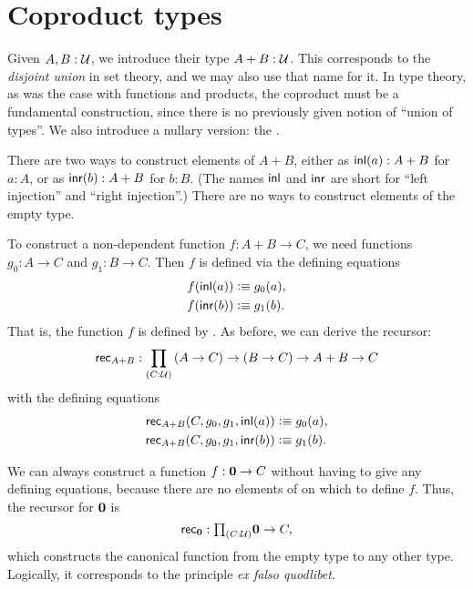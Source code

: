 \section{Coproduct types}
\label{sec:coproduct-types}

Given $A,B:\mathcal{U}$, we introduce their  type $A+B:\mathcal{U}$.
%
%
%
%
%
%
This corresponds to the \emph{disjoint union} in set theory, and we may also use that name for it.
In type theory, as was the case with functions and products, the coproduct must be a fundamental construction, since there is no previously given notion of ``union of types''.
We also introduce a
nullary version: the .
%
%
%

There are two ways to construct elements of $A+B$, either as ${\mathsf{inl}}(a) : A+B$ for $a:A$, or as
${\mathsf{inr}}(b):A+B$ for $b:B$.
(The names ${\mathsf{inl}}$ and ${\mathsf{inr}}$ are short for ``left injection'' and ``right injection''.)
There are no ways to construct elements of the empty type. 

To construct a non-dependent function $f : A+B \to C$, we need 
functions $g_0 : A \to C$ and $g_1 : B \to C$. Then $f$ is defined
via the defining equations
\begin{align*}
  f({\mathsf{inl}}(a)) &\vcentcolon\equiv g_0(a), \\
  f({\mathsf{inr}}(b)) &\vcentcolon\equiv g_1(b).
\end{align*}
That is, the function $f$ is defined by .
%
As before, we can derive the recursor:
%
\[ \rec{A+B} : \dprd{C:\UU}(A \to C) \to (B\to C) \to A+B \to C\]
with the defining equations
\begin{align*}
\mathsf{rec}_{A+B}(C,g_0,g_1,{\mathsf{inl}}(a)) &\vcentcolon\equiv g_0(a), \\
\mathsf{rec}_{A+B}(C,g_0,g_1,{\mathsf{inr}}(b)) &\vcentcolon\equiv g_1(b).
\end{align*}

We can always construct a function $f : \mathbf{0} \to C$ without
having to give any defining equations, because there are no elements of \emptyt on which to define $f$.
Thus, the recursor for $\mathbf{0}$ is
%
\[\rec{\emptyt} : \tprd{C:\UU} \emptyt \to C,\]
which constructs the canonical function from the empty type to any other type.
Logically, it corresponds to the principle \textit{ex falso quodlibet}.

